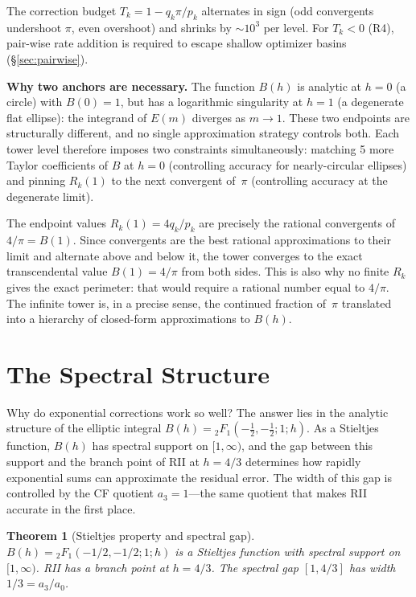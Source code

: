 \documentclass[12pt]{article}
\newtheorem{theorem}{Theorem}[section]
\begin{document}
The correction budget $T_k = 1 - q_k\pi/p_k$ alternates in sign (odd convergents undershoot $\pi$, even overshoot) and shrinks by ${\sim}10^3$ per level. For $T_k < 0$ (R4), pair-wise rate addition is required to escape shallow optimizer basins (\S\ref{sec:pairwise}).

\medskip
\noindent\textbf{Why two anchors are necessary.}
The function $B(h)$ is analytic at $h=0$ (a circle) with $B(0)=1$, but has a logarithmic singularity at $h=1$ (a degenerate flat ellipse): the integrand of $E(m)$ diverges as $m\to 1$.  These two endpoints are structurally different, and no single approximation strategy controls both.  Each tower level therefore imposes two constraints simultaneously: matching 5 more Taylor coefficients of $B$ at $h=0$ (controlling accuracy for nearly-circular ellipses) and pinning $R_k(1)$ to the next convergent of~$\pi$ (controlling accuracy at the degenerate limit).

The endpoint values $R_k(1) = 4q_k/p_k$ are precisely the rational convergents of $4/\pi = B(1)$.  Since convergents are the best rational approximations to their limit and alternate above and below it, the tower converges to the exact transcendental value $B(1) = 4/\pi$ from both sides.  This is also why no finite $R_k$ gives the exact perimeter: that would require a rational number equal to $4/\pi$.  The infinite tower is, in a precise sense, the continued fraction of~$\pi$ translated into a hierarchy of closed-form approximations to $B(h)$.

\section{The Spectral Structure}\label{sec:spectral}

Why do exponential corrections work so well?  The answer lies in the analytic structure of the elliptic integral $B(h) = {}_2F_1(-\tfrac{1}{2},-\tfrac{1}{2};1;h)$.  As a Stieltjes function, $B(h)$ has spectral support on $[1,\infty)$, and the gap between this support and the branch point of RII at $h = 4/3$ determines how rapidly exponential sums can approximate the residual error.  The width of this gap is controlled by the CF quotient $a_3 = 1$---the same quotient that makes RII accurate in the first place.

\begin{theorem}[Stieltjes property and spectral gap]
$B(h) = {}_2F_1(-1/2,-1/2;1;h)$ is a Stieltjes function with spectral support on $[1,\infty)$.
RII has a branch point at $h = 4/3$. The spectral gap $[1, 4/3]$ has width $1/3 = a_3/a_0$.
\end{theorem}
\end{document}
